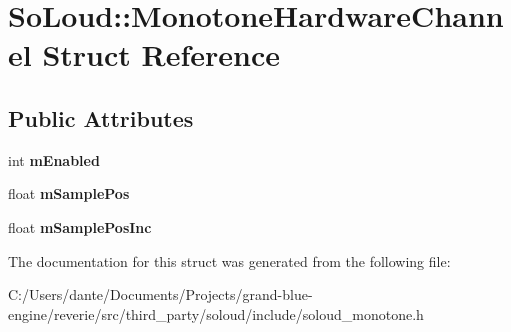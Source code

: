 \hypertarget{struct_so_loud_1_1_monotone_hardware_channel}{}\section{So\+Loud\+::Monotone\+Hardware\+Channel Struct Reference}
\label{struct_so_loud_1_1_monotone_hardware_channel}
\subsection*{Public Attributes}
\begin{DoxyCompactItemize}
\item 
\mbox{\label{struct_so_loud_1_1_monotone_hardware_channel_ac9b01626e2c41c0514b5dd5b31e638b3}} 
int {\bfseries m\+Enabled}
\item 
\mbox{\label{struct_so_loud_1_1_monotone_hardware_channel_ab174cd3122d83fcd84b4a59f83f1839b}} 
float {\bfseries m\+Sample\+Pos}
\item 
\mbox{\label{struct_so_loud_1_1_monotone_hardware_channel_a48d914147bfcc40f7060903fe3060540}} 
float {\bfseries m\+Sample\+Pos\+Inc}
\end{DoxyCompactItemize}


The documentation for this struct was generated from the following file\+:\begin{DoxyCompactItemize}
\item 
C\+:/\+Users/dante/\+Documents/\+Projects/grand-\/blue-\/engine/reverie/src/third\+\_\+party/soloud/include/soloud\+\_\+monotone.\+h\end{DoxyCompactItemize}
